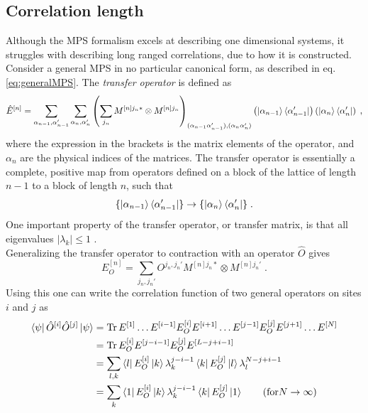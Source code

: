 \subsection{Correlation length}
Although the MPS formalism excels at describing one dimensional systems, it struggles with describing long ranged correlations, due to how it is constructed.
Consider a general MPS in no particular canonical form, as described in eq. \eqref{eq:generalMPS}. The \textit{transfer operator} is defined as
\begin{equation}
	\hat{E}^{[n]} = \sum_{\alpha_{n-1}, \alpha_{n-1}'} \sum_{\alpha_{n}, \alpha_{n}'} \left( \sum_{j_n} M^{[n] j_n *} \otimes  M^{[n] j_n} \right)_{(\alpha_{n-1} \alpha_{n-1}'),(\alpha_{n}  \alpha_{n}')} \left( \ket{\alpha_{n-1}}\bra{\alpha_{n-1}'} \right) \left( \ket{\alpha_{n}}\bra{\alpha_{n}'} \right) \; ,
\end{equation}   
where the expression in the brackets is the matrix elements of the operator, and $\alpha_n$ are the physical indices of the matrices. The transfer operator is essentially a complete, positive map from operators defined on a block of the lattice of length $n-1$ to a block of length $n$, such that
\begin{equation}
	\{ \ket{\alpha_{n-1}}\bra{\alpha_{n-1}'} \} \to \{ \ket{\alpha_{n}}\bra{\alpha_{n}'} \} \; .
\end{equation}
One important property of the transfer operator, or transfer matrix, is that all eigenvalues $|\lambda_k| \leq 1 $ \cite{schollwock}. \\
Generalizing the transfer operator to contraction with an operator $\hat{O}$ gives
\begin{equation}
	E_{O}^{[n]} = \sum_{j_n , j_n '} O^{j_n , j_n '} M^{[n] j_n *} \otimes  M^{[n] j_n '} \; .
\end{equation}
Using this one can write the correlation function of two general operators on sites $i$ and $j$ as
\begin{align}
	\bra{\psi} \hat{O}^{[i]} \hat{O}^{[j]} \ket{\psi} &= \Tr E^{[1]} \ldots E^{[i-1]} E_{O}^{[i]} E^{[i+1]} \ldots E^{[j-1]} E_{O}^{[j]} E^{[j+1]} \ldots E^{[N]} \nonumber \\
	&= \Tr E_{O}^{[i]} E^{[j-i-1]} E_{O}^{[j]} E^{[L-j+i-1]} \nonumber \\ 
	&= \sum_{l , k} \bra{l} E_{O}^{[i]} \ket{k} \lambda_{k}^{j-i-1} \bra{k} E_{O}^{[j]} \ket{l} \lambda_{l}^{N-j+i-1} \nonumber \\ 
	&= \sum_{k} \bra{1} E_{O}^{[i]} \ket{k} \lambda_{k}^{j-i-1} \bra{k} E_{O}^{[j]} \ket{1} \qquad (\mathrm{for } N \to \infty)
\end{align}
